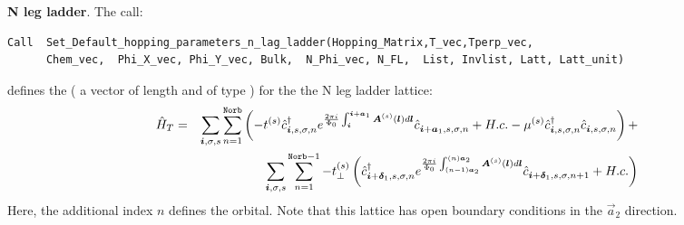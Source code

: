 \noindent
\textbf{N leg ladder}.     The call:
 \begin{lstlisting}[style=fortran]
Call  Set_Default_hopping_parameters_n_lag_ladder(Hopping_Matrix,T_vec,Tperp_vec, 
      Chem_vec,  Phi_X_vec, Phi_Y_vec, Bulk,  N_Phi_vec, N_FL,  List, Invlist, Latt, Latt_unit)
\end{lstlisting}  
defines  the   (  a vector of length   and of type  )    for the   the  N leg ladder lattice:                 
\begin{eqnarray}
\hat{H}_T  =  & &   \sum_{\boldsymbol{i}, \sigma, s }  \sum_{n=1}^{\texttt{Norb}} \left(      - t^{(s)} \hat{c}^{\dagger}_{\boldsymbol{i},s,\sigma,n}   e^{\frac{2 \pi i}{\Phi_0} \int_{\boldsymbol{i}}^{\boldsymbol{i}+ \boldsymbol{a}_1}  \boldsymbol{A}^{(s)}(\boldsymbol{l})  d \boldsymbol{l}}   \hat{c}^{}_{\boldsymbol{i} + \boldsymbol{a}_1,s,\sigma,n} +  H.c.       -  \mu^{(s)} \hat{c}^{\dagger}_{\boldsymbol{i},s,\sigma,n} \hat{c}^{}_{\boldsymbol{i},s,\sigma,n}  \right)  +  \nonumber \\
      & &    \sum_{\boldsymbol{i}, \sigma, s } \sum_{n=1}^{\texttt{Norb}-1}  -  t_{\perp}^{(s)}  \left( 
                   \hat{c}^{\dagger}_{\boldsymbol{i} + \boldsymbol{\delta}_1,s,\sigma,n}  e^{\frac{2 \pi i}{\Phi_0} \int_{(n-1)\boldsymbol{a}_2}^{(n)\boldsymbol{a}_2}  \boldsymbol{A}^{(s)}(\boldsymbol{l})  d \boldsymbol{l}}    \hat{c}^{}_{\boldsymbol{i} + \boldsymbol{\delta}_1,s,\sigma,n+1}  + H.c.  \right) 
\end{eqnarray}
Here, the additional  index  $n$  defines  the orbital.  Note that this lattice  has open boundary conditions in the $\vec{a}_2$  direction. 
